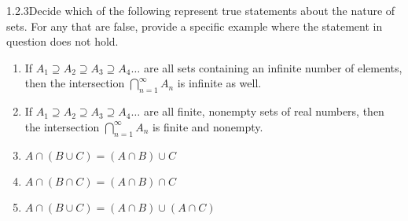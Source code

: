 
\begin{exercise}
    {1.2.3}Decide which of the following represent true statements about
    the nature of sets. For any that are false, provide a specific example where the
    statement in question does not hold.
    \begin{enumerate}
        \item If \(A_1 \supseteq A_2 \supseteq A_3 \supseteq A_4\dots\) are all sets containing an infinite number of
              elements, then the intersection \(\bigcap^\infty_{n=1} A_n\) is infinite as well.
        \item If \(A_1 \supseteq A_2 \supseteq A_3 \supseteq A_4\dots\) are all finite, nonempty sets of real numbers,
              then the intersection \(\bigcap^\infty_{n=1} A_n\) is finite and nonempty.
        \item \(A \cap (B \cup C) = (A \cap B) \cup C\)
        \item \(A \cap (B \cap C) = (A \cap B) \cap C\)
        \item \(A \cap (B \cup C) = (A \cap B) \cup (A \cap C)\)
    \end{enumerate}
\end{exercise}

